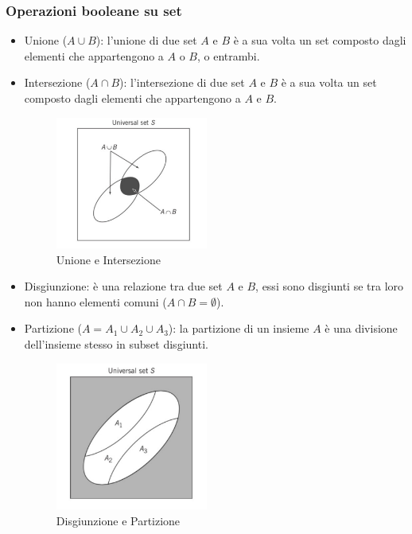         \subsubsection{Operazioni booleane su set}
            \begin{itemize}
                \item {Unione ($A\cup B$): l'unione di due set $A$ e $B$ è a sua volta un set composto dagli elementi che appartengono a $A$ o $B$, o entrambi.}
                \item {Intersezione ($A\cap B$): l'intersezione di due set $A$ e $B$ è a sua volta un set composto dagli elementi che appartengono a $A$ e $B$.
                \begin{figure}[H]
                    \centering
                    \includegraphics[width = 5cm]{media/Unione_Intersezione.png}
                    \caption{Unione e Intersezione} 
                \end{figure}
                }
                \item {Disgiunzione: è una relazione tra due set $A$ e $B$, essi sono disgiunti se tra loro non hanno elementi comuni ($A\cap B = \emptyset $).}
                \item {Partizione ($A = A_1\cup A_2\cup A_3$): la partizione di un insieme $A$ è una divisione dell'insieme stesso in subset disgiunti.
                \begin{figure}[H]
                    \centering
                    \includegraphics[width = 5cm]{media/Insiemi_distinti.png}
                    \caption{Disgiunzione e Partizione} 
                \end{figure}
}
\end{itemize}
